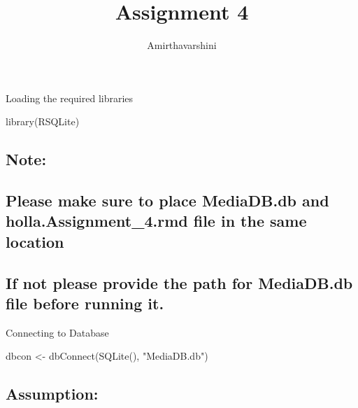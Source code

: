 \documentclass[
]{article}
\title{Assignment 4}
\author{Amirthavarshini}
\date{}
\newenvironment{Shaded}{\begin{snugshade}}{\end{snugshade}}
\newcommand{\FunctionTok}[1]{\textcolor[rgb]{0.00,0.00,0.00}{#1}}
\newcommand{\NormalTok}[1]{#1}
\newcommand{\OtherTok}[1]{\textcolor[rgb]{0.56,0.35,0.01}{#1}}
\newcommand{\StringTok}[1]{\textcolor[rgb]{0.31,0.60,0.02}{#1}}
\begin{document}
\maketitle

Loading the required libraries

\begin{Shaded}
\begin{Highlighting}[]
\FunctionTok{library}\NormalTok{(RSQLite)}
\end{Highlighting}
\end{Shaded}

\hypertarget{note}{%
\subsection{Note:}\label{note}}

\hypertarget{please-make-sure-to-place-mediadb.db-and-holla.assignment_4.rmd-file-in-the-same-location}{%
\subsection{Please make sure to place MediaDB.db and
holla.Assignment\_4.rmd file in the same
location}\label{please-make-sure-to-place-mediadb.db-and-holla.assignment_4.rmd-file-in-the-same-location}}

\hypertarget{if-not-please-provide-the-path-for-mediadb.db-file-before-running-it.}{%
\subsection{If not please provide the path for MediaDB.db file before
running
it.}\label{if-not-please-provide-the-path-for-mediadb.db-file-before-running-it.}}

Connecting to Database

\begin{Shaded}
\begin{Highlighting}[]
\NormalTok{dbcon }\OtherTok{\textless{}{-}} \FunctionTok{dbConnect}\NormalTok{(}\FunctionTok{SQLite}\NormalTok{(), }\StringTok{"MediaDB.db"}\NormalTok{)}
\end{Highlighting}
\end{Shaded}

\hypertarget{assumption}{%
\subsection{Assumption:}\label{assumption}}
\end{document}
